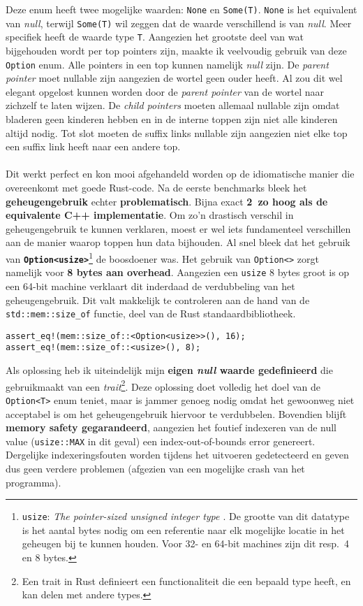 Deze enum heeft twee mogelijke waarden: \texttt{None} en \texttt{Some(T)}.
\texttt{None} is het equivalent van \textit{null}, terwijl \texttt{Some(T)} wil zeggen dat de waarde verschillend is van \textit{null}.
Meer specifiek heeft de waarde type \texttt{T}.
Aangezien het grootste deel van wat bijgehouden wordt per top pointers zijn, maakte ik veelvoudig gebruik van deze \texttt{Option} enum.
Alle pointers in een top kunnen namelijk \textit{null} zijn.
De \textit{parent pointer} moet nullable zijn aangezien de wortel geen ouder heeft.
Al zou dit wel elegant opgelost kunnen worden door de \textit{parent pointer} van de wortel naar zichzelf te laten wijzen.
De \textit{child pointers} moeten allemaal nullable zijn omdat bladeren geen kinderen hebben en in de interne toppen zijn niet alle kinderen altijd nodig.
Tot slot moeten de suffix links nullable zijn aangezien niet elke top een suffix link heeft naar een andere top.
\\ \\
Dit werkt perfect en kon mooi afgehandeld worden op de idiomatische manier die overeenkomt met goede Rust-code.
Na de eerste benchmarks bleek het \textbf{geheugengebruik} echter \textbf{problematisch}.
Bijna exact \textbf{2\times\ zo hoog als de equivalente C++ implementatie}.
Om zo'n drastisch verschil in geheugengebruik te kunnen verklaren, moest er wel iets fundamenteel verschillen aan de manier waarop toppen hun data bijhouden.
Al snel bleek dat het gebruik van \textbf{\texttt{Option<usize>}}\footnote{\texttt{usize}: \textit{The pointer-sized unsigned integer type \cite{usize}}. De grootte van dit datatype is het aantal bytes nodig om een referentie naar elk mogelijke locatie in het geheugen bij te kunnen houden. Voor 32- en 64-bit machines zijn dit resp.~4 en 8 bytes.} de boosdoener was.
Het gebruik van \texttt{Option<>} zorgt namelijk voor \textbf{8 bytes aan overhead}.
Aangezien een \texttt{usize} 8 bytes groot is op een 64-bit machine verklaart dit inderdaad de verdubbeling van het geheugengebruik.
Dit valt makkelijk te controleren aan de hand van de \texttt{std::mem::size\_of} functie, deel van de Rust standaardbibliotheek.
\begin{verbatim}
assert_eq!(mem::size_of::<Option<usize>>(), 16);
assert_eq!(mem::size_of::<usize>(), 8);
\end{verbatim}

Als oplossing heb ik uiteindelijk mijn \textbf{eigen \textit{null} waarde gedefinieerd} die gebruikmaakt van een \textit{trait}\footnote{Een trait in Rust definieert een functionaliteit die een bepaald type heeft, en kan delen met andere types.}.
Deze oplossing doet volledig het doel van de \texttt{Option<T>} enum teniet, maar is jammer genoeg nodig omdat het gewoonweg niet acceptabel is om het geheugengebruik hiervoor te verdubbelen.
Bovendien blijft \textbf{memory safety gegarandeerd}, aangezien het foutief indexeren van de null value (\texttt{usize::MAX} in dit geval) een index-out-of-bounds error genereert.
Dergelijke indexeringsfouten worden tijdens het uitvoeren gedetecteerd en geven dus geen verdere problemen (afgezien van een mogelijke crash van het programma).

